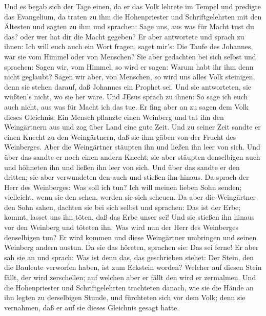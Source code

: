  Und es begab sich der Tage einen, da er das Volk lehrete im
Tempel und predigte das Evangelium, da traten zu ihm die Hohenpriester
und Schriftgelehrten mit den Ältesten  und sagten zu ihm und
sprachen: Sage uns, aus was für Macht tust du das? oder wer hat dir die
Macht gegeben?  Er aber antwortete und sprach zu ihnen: Ich
will euch auch ein Wort fragen, saget mir's:  Die Taufe des
Johannes, war sie vom Himmel oder von Menschen?  Sie aber
gedachten bei sich selbst und sprachen: Sagen wir, vom Himmel, so wird
er sagen: Warum habt ihr ihm denn nicht geglaubt?  Sagen wir
aber, von Menschen, so wird uns alles Volk steinigen, denn sie stehen
darauf, daß Johannes ein Prophet sei.  Und sie antworteten,
sie wüßten's nicht, wo sie her wäre.  Und JEsus sprach zu
ihnen: So sage ich euch auch nicht, aus was für Macht ich das tue.
 Er fing aber an zu sagen dem Volk dieses Gleichnis: Ein
Mensch pflanzte einen Weinberg und tat ihn den Weingärtnern aus und zog
über Land eine gute Zeit.  Und zu seiner Zeit sandte er
einen Knecht zu den Weingärtnern, daß sie ihm gäben von der Frucht des
Weinberges. Aber die Weingärtner stäupten ihn und ließen ihn leer von
sich.  Und über das sandte er noch einen andern Knecht; sie
aber stäupten denselbigen auch und höhneten ihn und ließen ihn leer von
sich.  Und über das sandte er den dritten; sie aber
verwundeten den auch und stießen ihn hinaus.  Da sprach der
Herr des Weinberges: Was soll ich tun? Ich will meinen lieben Sohn
senden; vielleicht, wenn sie den sehen, werden sie sich scheuen.
 Da aber die Weingärtner den Sohn sahen, dachten sie bei
sich selbst und sprachen: Das ist der Erbe; kommt, lasset uns ihn töten,
daß das Erbe unser sei!  Und sie stießen ihn hinaus vor den
Weinberg und töteten ihn. Was wird nun der Herr des Weinberges
denselbigen tun?  Er wird kommen und diese Weingärtner
umbringen und seinen Weinberg andern austun. Da sie das höreten,
sprachen sie: Das sei ferne!  Er aber sah sie an und
sprach: Was ist denn das, das geschrieben stehet: Der Stein, den die
Bauleute verworfen haben, ist zum Eckstein worden?  Welcher
auf diesen Stein fällt, der wird zerschellen; auf welchen aber er fällt
den wird er zermalmen.  Und die Hohenpriester und
Schriftgelehrten trachteten danach, wie sie die Hände an ihn legten zu
derselbigen Stunde, und fürchteten sich vor dem Volk; denn sie
vernahmen, daß er auf sie dieses Gleichnis gesagt hatte. 
